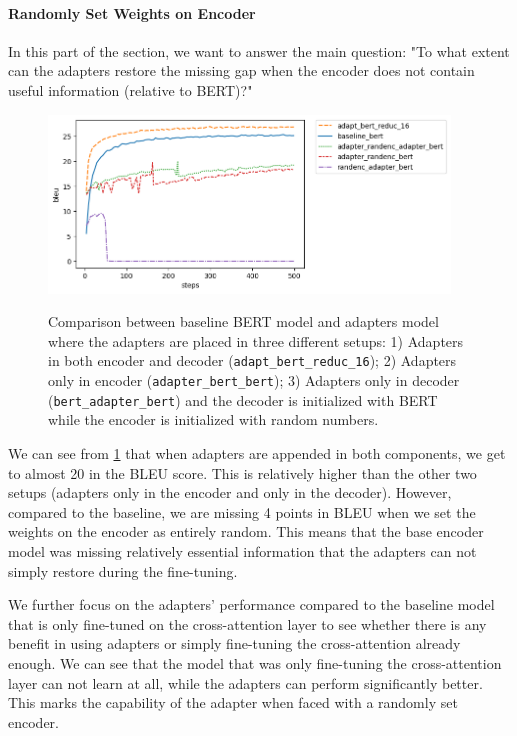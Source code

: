\paragraph{Randomly Set Weights on Encoder}
In this part of the section, we want to answer the main question: "To what extent can the adapters restore the missing gap when the encoder does not contain useful information (relative to BERT)?"

\begin{figure}[h]
    {\includegraphics[width=0.95\textwidth]{img/adapter_bert_randenc.png}}
    \centering
    \caption[Comparison for model with adapters in the decoder and the encoder is initalized with random weights.]{Comparison between baseline BERT model and adapters model where the adapters are placed in three different setups: 1) Adapters in both encoder and decoder (\texttt{adapt\_bert\_reduc\_16}); 2) Adapters only in encoder (\texttt{adapter\_bert\_bert}); 3) Adapters only in decoder (\texttt{bert\_adapter\_bert}) and the decoder is initialized with BERT while the encoder is initialized with random numbers.}
    \label{img:adapt_bert_randenc}
\end{figure}

We can see from \cref{img:adapt_bert_randenc} that when adapters are appended in both components, we get to almost 20 in the BLEU score. This is relatively higher than the other two setups (adapters only in the encoder and only in the decoder). However, compared to the baseline, we are missing 4 points in BLEU when we set the weights on the encoder as entirely random. This means that the base encoder model was missing relatively essential information that the adapters can not simply restore during the fine-tuning.

We further focus on the adapters' performance compared to the baseline model that is only fine-tuned on the cross-attention layer to see whether there is any benefit in using adapters or simply fine-tuning the cross-attention already enough. We can see that the model that was only fine-tuning the cross-attention layer can not learn at all, while the adapters can perform significantly better. This marks the capability of the adapter when faced with a randomly set encoder.

